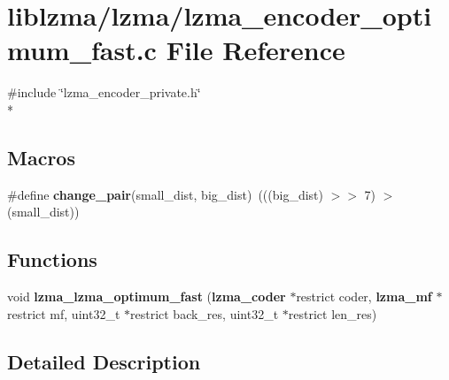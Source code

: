 \section{liblzma/lzma/lzma\-\_\-encoder\-\_\-optimum\-\_\-fast.c File Reference}
\label{lzma__encoder__optimum__fast_8c}
{\ttfamily \#include \char`\"{}lzma\-\_\-encoder\-\_\-private.\-h\char`\"{}}\\*
\subsection*{Macros}
\begin{DoxyCompactItemize}
\item 
\#define {\bfseries change\-\_\-pair}(small\-\_\-dist, big\-\_\-dist)~(((big\-\_\-dist) $>$$>$ 7) $>$ (small\-\_\-dist))\label{lzma__encoder__optimum__fast_8c_a6c81740f4cb07ddc494a3daffeb1ab54}

\end{DoxyCompactItemize}
\subsection*{Functions}
\begin{DoxyCompactItemize}
\item 
void {\bfseries lzma\-\_\-lzma\-\_\-optimum\-\_\-fast} ({\bf lzma\-\_\-coder} $\ast$restrict coder, {\bf lzma\-\_\-mf} $\ast$restrict mf, uint32\-\_\-t $\ast$restrict back\-\_\-res, uint32\-\_\-t $\ast$restrict len\-\_\-res)\label{lzma__encoder__optimum__fast_8c_a0fd48fee67afb38e259dd0393b998d95}

\end{DoxyCompactItemize}


\subsection{Detailed Description}
